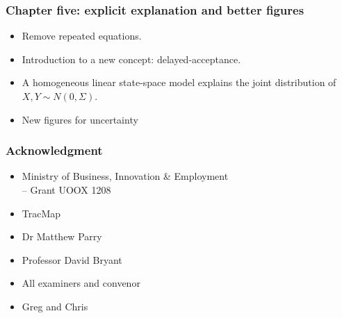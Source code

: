 \documentclass{beamer}
\begin{document}
\begin{frame}
\frametitle{Chapter five: explicit explanation and better figures}

\begin{itemize}
	\item Remove repeated equations.
	\item Introduction to a new concept: delayed-acceptance.
	\item A homogeneous linear state-space model explains the joint distribution of $X,Y \sim N(0,\Sigma)$.
	\item New figures for uncertainty 
	\begin{figure}[h]
		\centering
	\end{figure}
\end{itemize}


\end{frame}

\begin{frame}
\frametitle{Acknowledgment}
\begin{itemize}
\item Ministry of Business, Innovation \& Employment\\
 \hskip 0.5cm -- Grant UOOX 1208\\
\item TracMap\\
\item Dr Matthew Parry\\
\item Professor David Bryant \\
\item All examiners and convenor \\
\item Greg and Chris
\end{itemize}
\end{frame}
\end{document}
